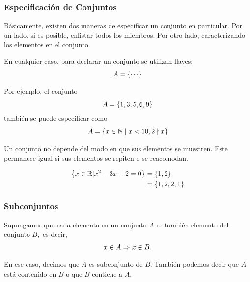 \documentclass[xcolor={svgnames},
  hyperref={colorlinks}, 
  spanish, 12pt]{beamer}
\numberwithin{equation}{section} %
\numberwithin{figure}{section} %
\begin{document}
\subsubsection{Especificaci\'on de Conjuntos}

\begin{frame}
 B\'asicamente, existen dos maneras de especificar un conjunto en particular. \pause Por un lado, si es posible, enlistar todos los miembros. \pause Por otro lado, caracterizando los elementos en el conjunto.
\end{frame}

\begin{frame}
 En cualquier caso, para declarar un conjunto se utilizan llaves:
 $$
 A=\set{\cdots}
 $$
\end{frame}

\begin{frame}
 Por ejemplo, el conjunto 
 $$
 A=\left\{ 1,3,5,6,9 \right\}
 $$
 tambi\'en se puede especificar como
 $$
 A=\left\{ x\in \mathbb{N} \mid x<10, 2\nmid x  \right\}
 $$
\end{frame}

\begin{frame}
 Un conjunto no depende del modo en que sus elementos se muestren. \pause Este permanece igual si sus elementos se repiten o se reacomodan.
\end{frame}


\begin{frame}
 \begin{exmp}
  \begin{align}
   \left\{ x\in\mathbb{R} | x^{2}-3x+2=0 \right\} & =\left\{ 1,2 \right\} \\
   &=\left\{ 1,2,2,1 \right\}
  \end{align}

 \end{exmp}

\end{frame}

\subsubsection{Subconjuntos}

\begin{frame}
 Supongamos que cada elemento en un conjunto $A$ es tambi\'en elemento del conjunto $B,$ es decir,
 $$
 x\in A \Rightarrow x\in B.
 $$
\end{frame}

\begin{frame}
 En ese caso, decimos que $A$ es subconjunto de $B.$ \pause Tambi\'en podemos decir que $A$ est\'a contenido en $B$ o que $B$ contiene a $A$.
\end{frame}
\end{document}
